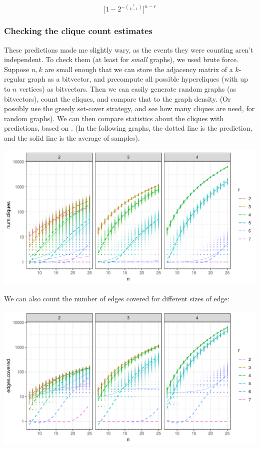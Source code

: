 \documentclass[12pt]{article}
\theoremstyle{definition}
\begin{document}
\[
\Big[1 - 2^{-{r \choose {k-1}}}\Big]^{n - r}
\]


\subsubsection{Checking the clique count estimates}

These predictions made me slightly wary, as the events they were counting
aren't independent.
To check them (at least for {\em small} graphs), we used brute force.
Suppose $n, k$ are small enough that we can 
store the adjacency matrix of a $k$-regular graph as a bitvector, and precompute
all possible hypercliques
(with up to $n$ vertices) as bitvectors. Then we can easily generate
random graphs (as bitvectors), count the cliques, and compare that to the graph
density. (Or possibly use the greedy set-cover strategy, and see how
many cliques are need, for random graphs).
We can then compare statistics about the cliques with predictions,
based on \cite{bollobas1976cliques}.
(In the following graphs, the dotted line is the prediction, and
the solid line is the average of samples).

\includegraphics[width=1\textwidth]{cliqueCounter/R/numCliques.png}

We can also count the number of edges covered for different sizes
of edge:

\includegraphics[width=1\textwidth]{cliqueCounter/R/edgesCovered.png}
\end{document}
